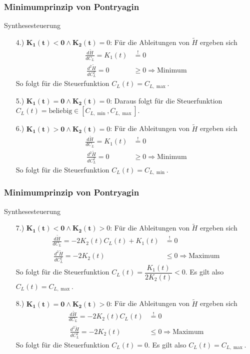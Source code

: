 \documentclass[aspectratio=169]{beamer}
\begin{document}
\begin{frame}
  \frametitle{Minimumprinzip von Pontryagin}
    \tiny
  \begin{block}{Synthesesteuerung}  
      \begin{enumerate}
        \item[4.)] $\mathbf{K_1(t) < 0 \wedge K_2(t)} = 0$: Für die Ableitungen von $\tilde{H}$ ergeben sich
        \[\begin{split}
        \frac{d \tilde{H}}{d C_L} = K_1(t) &\stackrel{!}{=} 0 \\\
        \frac{d^2 \tilde{H}}{d C_L^2} = 0 &\geq 0 \Rightarrow \text{Minimum}
        \end{split}\]
        So folgt für die Steuerfunktion $C_L(t) = C_{L, \max}$.
        \item[5.)] $\mathbf{K_1(t) = 0 \wedge K_2(t)} = 0$: Daraus folgt für die Steuerfunktion $C_L(t) = \text{beliebig} \in [C_{L, \min},C_{L, \max}]$.
                \item[6.)] $\mathbf{K_1(t) > 0 \wedge K_2(t)} = 0$: Für die Ableitungen von $\tilde{H}$ ergeben sich
        \[\begin{split}
        \frac{d \tilde{H}}{d C_L} = K_1(t) &\stackrel{!}{=} 0 \\\
        \frac{d^2 \tilde{H}}{d C_L^2} = 0 &\geq 0 \Rightarrow \text{Minimum}
        \end{split}\]
        So folgt für die Steuerfunktion $C_L(t) = C_{L, \min}$.
        \end{enumerate}
      \end{block}
\end{frame}


\begin{frame}
  \frametitle{Minimumprinzip von Pontryagin}
    \tiny
  \begin{block}{Synthesesteuerung}  
      \begin{enumerate}
   \item[7.)] $\mathbf{K_1(t) < 0 \wedge K_2(t)} > 0$: Für die Ableitungen von $\tilde{H}$ ergeben sich
        \[\begin{split}
        \frac{d \tilde{H}}{d C_L} = - 2 K_2(t) C_L(t) + K_1(t) &\stackrel{!}{=} 0 \\\
        \frac{d^2 \tilde{H}}{d C_L^2} = - 2 K_2(t) &\leq 0 \Rightarrow \text{Maximum}
        \end{split}\]
        So folgt für die Steuerfunktion $C_L(t) = \dfrac{K_1(t)}{2 K_2(t)} < 0$. Es gilt also $C_L(t) = C_{L, \max}$.
        \item[8.)] $\mathbf{K_1(t) = 0 \wedge K_2(t)} > 0$: Für die Ableitungen von $\tilde{H}$ ergeben sich
        \[\begin{split}
        \frac{d \tilde{H}}{d C_L} = - 2 K_2(t) C_L(t) &\stackrel{!}{=} 0 \\\
        \frac{d^2 \tilde{H}}{d C_L^2} = - 2 K_2(t) &\leq 0 \Rightarrow \text{Maximum}
        \end{split}\]
        So folgt für die Steuerfunktion $C_L(t) = 0$. Es gilt also $C_L(t) = C_{L, \max}$.
        \end{enumerate}
      \end{block}
\end{frame}
\end{document}

